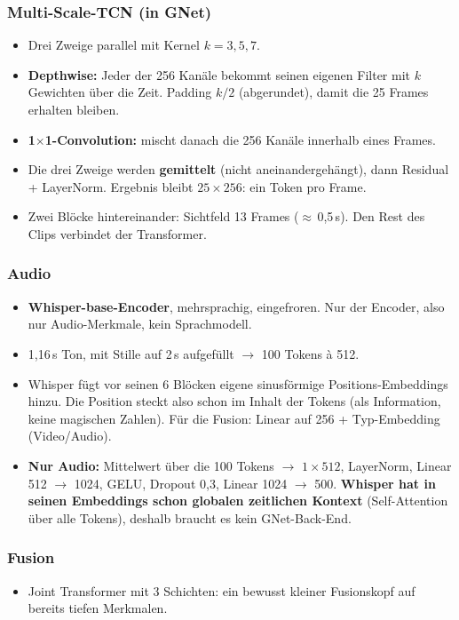 \documentclass[11pt,a4paper]{article}
\newcommand{\achtung}[1]{{\color{uzhockerrot100}\textbf{#1}}}
\begin{document}
\subsubsection{Multi-Scale-TCN (in GNet)}
\begin{itemize}
  \item Drei Zweige parallel mit Kernel $k = 3, 5, 7$.
  \item \textbf{Depthwise:} Jeder der 256 Kanäle bekommt seinen eigenen Filter mit $k$ Gewichten
        über die Zeit. Padding $k/2$ (abgerundet), damit die 25 Frames erhalten bleiben.
  \item \textbf{1$\times$1-Convolution:} mischt danach die 256 Kanäle innerhalb eines Frames.
  \item Die drei Zweige werden \textbf{gemittelt} (nicht aneinandergehängt), dann Residual +
        LayerNorm. Ergebnis bleibt $25 \times 256$: ein Token pro Frame.
  \item Zwei Blöcke hintereinander: Sichtfeld 13 Frames ($\approx$\,0,5\,s). Den Rest des Clips
        verbindet der Transformer.
\end{itemize}

\subsubsection{Audio}
\begin{itemize}
  \item \textbf{Whisper-base-Encoder}, mehrsprachig, eingefroren. Nur der Encoder, also nur
        Audio-Merkmale, kein Sprachmodell.
  \item 1,16\,s Ton, mit Stille auf 2\,s aufgefüllt $\to$ 100 Tokens à 512.
  \item Whisper fügt vor seinen 6 Blöcken eigene sinusförmige Positions-Embeddings hinzu. Die
        Position steckt also schon im Inhalt der Tokens (als Information, keine magischen
        Zahlen). Für die Fusion: Linear auf 256 + Typ-Embedding (Video/Audio).
  \item \textbf{Nur Audio:} Mittelwert über die 100 Tokens $\to$ $1 \times 512$, LayerNorm,
        Linear 512 $\to$ 1024, GELU, Dropout 0,3, Linear 1024 $\to$ 500.
        \achtung{Whisper hat in seinen Embeddings schon globalen zeitlichen Kontext}
        (Self-Attention über alle Tokens), deshalb braucht es kein GNet-Back-End.
\end{itemize}

\subsubsection{Fusion}
\begin{itemize}
  \item Joint Transformer mit 3 Schichten: ein bewusst kleiner Fusionskopf auf bereits tiefen
        Merkmalen.
\end{itemize}
\end{document}
